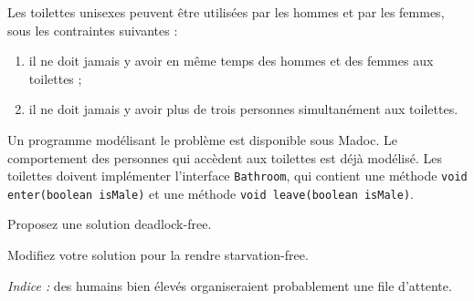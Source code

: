 
\begingroup

\begin{exercice}
  \label{exo:monitors/unisex}
    
  Les toilettes unisexes peuvent être utilisées par les hommes et par les femmes, sous les contraintes suivantes :
  \begin{enumerate}
  \item il ne doit jamais y avoir en même temps des hommes et des femmes aux toilettes ;
  \item il ne doit jamais y avoir plus de trois personnes simultanément aux toilettes.
  \end{enumerate}
  
  Un programme modélisant le problème est disponible sous Madoc. Le comportement des personnes qui
  accèdent aux toilettes est déjà modélisé. Les toilettes doivent implémenter l'interface
  \lstinline{Bathroom}, qui contient une méthode \lstinline{void enter(boolean isMale)} et une méthode \lstinline{void leave(boolean isMale)}. 
  
  \begin{question}
  \item Proposez une solution deadlock-free.
  \item Modifiez votre solution pour la rendre starvation-free.
  \end{question}

  \emph{Indice :} des humains bien élevés organiseraient probablement une file d'attente.  

\end{exercice}

\endgroup
\endinput
